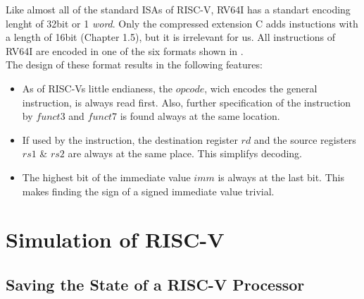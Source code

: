 Like almost all of the standard ISAs of RISC-V, RV64I has a standart encoding lenght of 32bit or 1 \emph{word}.
Only the compressed extension C adds instuctions with a length of 16bit \cite{riscv-isa}(Chapter 1.5), but it is irrelevant for us.
All instructions of RV64I are encoded in one of the six formats shown in .\\
The design of these format results in the following features:
\begin{itemize}
    \item As of RISC-Vs little endianess, the $opcode$, wich encodes the general instruction, is always read first.
            Also, further specification of the instruction by $funct3$ and $funct7$ is found always at the same location.
    \item If used by the instruction, the destination register $rd$ and the source registers $rs1$ \& $rs2$ are always at the same place. This simplifys decoding.
    \item The highest bit of the immediate value $imm$ is always at the last bit. This makes finding the sign of a signed immediate value trivial.
\end{itemize}






\section{Simulation of RISC-V}

\subsection{Saving the State of a RISC-V Processor}\label{statefile}